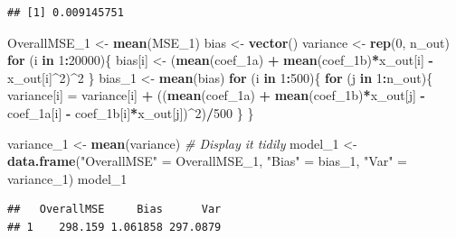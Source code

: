 \documentclass[]{article}
\newenvironment{Shaded}{\begin{snugshade}}{\end{snugshade}}
\newcommand{\KeywordTok}[1]{\textcolor[rgb]{0.13,0.29,0.53}{\textbf{#1}}}
\newcommand{\DecValTok}[1]{\textcolor[rgb]{0.00,0.00,0.81}{#1}}
\newcommand{\StringTok}[1]{\textcolor[rgb]{0.31,0.60,0.02}{#1}}
\newcommand{\CommentTok}[1]{\textcolor[rgb]{0.56,0.35,0.01}{\textit{#1}}}
\newcommand{\ControlFlowTok}[1]{\textcolor[rgb]{0.13,0.29,0.53}{\textbf{#1}}}
\newcommand{\OperatorTok}[1]{\textcolor[rgb]{0.81,0.36,0.00}{\textbf{#1}}}
\newcommand{\NormalTok}[1]{#1}
\begin{document}
\begin{verbatim}
## [1] 0.009145751
\end{verbatim}

\begin{Shaded}
\begin{Highlighting}[]
\NormalTok{OverallMSE_}\DecValTok{1}\NormalTok{ <-}\StringTok{ }\KeywordTok{mean}\NormalTok{(MSE_}\DecValTok{1}\NormalTok{)}
\NormalTok{bias <-}\StringTok{ }\KeywordTok{vector}\NormalTok{()}
\NormalTok{variance <-}\StringTok{ }\KeywordTok{rep}\NormalTok{(}\DecValTok{0}\NormalTok{, n_out)}
\ControlFlowTok{for}\NormalTok{ (i }\ControlFlowTok{in} \DecValTok{1}\OperatorTok{:}\DecValTok{20000}\NormalTok{)\{}
\NormalTok{  bias[i] <-}\StringTok{ }\NormalTok{(}\KeywordTok{mean}\NormalTok{(coef_1a) }\OperatorTok{+}\StringTok{ }\KeywordTok{mean}\NormalTok{(coef_1b)}\OperatorTok{*}\NormalTok{x_out[i] }\OperatorTok{-}\StringTok{ }\NormalTok{x_out[i]}\OperatorTok{^}\DecValTok{2}\NormalTok{)}\OperatorTok{^}\DecValTok{2}
\NormalTok{\}}
\NormalTok{bias_}\DecValTok{1}\NormalTok{ <-}\StringTok{ }\KeywordTok{mean}\NormalTok{(bias)}
\ControlFlowTok{for}\NormalTok{ (i }\ControlFlowTok{in} \DecValTok{1}\OperatorTok{:}\DecValTok{500}\NormalTok{)\{}
  \ControlFlowTok{for}\NormalTok{ (j }\ControlFlowTok{in} \DecValTok{1}\OperatorTok{:}\NormalTok{n_out)\{}
\NormalTok{    variance[i] =}\StringTok{ }\NormalTok{variance[i] }\OperatorTok{+}\StringTok{ }\NormalTok{((}\KeywordTok{mean}\NormalTok{(coef_1a) }\OperatorTok{+}\StringTok{ }\KeywordTok{mean}\NormalTok{(coef_1b)}\OperatorTok{*}\NormalTok{x_out[j] }\OperatorTok{-}\StringTok{ }\NormalTok{coef_1a[i] }\OperatorTok{-}\StringTok{ }\NormalTok{coef_1b[i]}\OperatorTok{*}\NormalTok{x_out[j])}\OperatorTok{^}\DecValTok{2}\NormalTok{)}\OperatorTok{/}\DecValTok{500}
\NormalTok{  \}}
\NormalTok{\}}

\NormalTok{variance_}\DecValTok{1}\NormalTok{ <-}\StringTok{ }\KeywordTok{mean}\NormalTok{(variance)}
\CommentTok{# Display it tidily}
\NormalTok{model_}\DecValTok{1}\NormalTok{ <-}\StringTok{ }\KeywordTok{data.frame}\NormalTok{(}\StringTok{"OverallMSE"}\NormalTok{ =}\StringTok{ }\NormalTok{OverallMSE_}\DecValTok{1}\NormalTok{, }\StringTok{"Bias"}\NormalTok{ =}\StringTok{ }\NormalTok{bias_}\DecValTok{1}\NormalTok{, }\StringTok{"Var"}\NormalTok{ =}\StringTok{ }\NormalTok{variance_}\DecValTok{1}\NormalTok{)}
\NormalTok{model_}\DecValTok{1}
\end{Highlighting}
\end{Shaded}

\begin{verbatim}
##   OverallMSE     Bias      Var
## 1    298.159 1.061858 297.0879
\end{verbatim}
\end{document}
